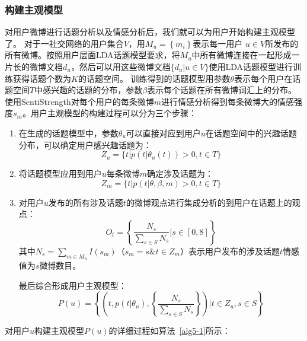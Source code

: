 \subsubsection{构建主观模型}
\label{concrete}
对用户微博进行话题分析以及情感分析后，我们就可以为用户开始构建主观模型了。
对于一社交网络的用户集合$ V $，用$ M_{u}=\left\lbrace m_{i} \right\rbrace$表示每一用户 $ u \in V $所发布的所有微博。按照用户层面LDA话题模型要求，将$ M_{u} $中所有微博连接在一起形成一片长的微博文档$ d_{u} $，然后可以用这些微博文档$\{ d_{u}|u \in V\} $使用LDA话题模型进行训练获得话题个数为$ K $的话题空间。
训练得到的话题模型用参数$ \theta $表示每个用户在话题空间$ T $中感兴趣的话题的分布，参数$ \beta $表示每个话题在所有微博词汇上的分布。
使用SentiStrength对每个用户的每条微博$ m $进行情感分析得到每条微博大的情感强度$ s_{m} $。用户主观模型的构建过程可以分为三个步骤：
\begin{enumerate}
\item 在生成的话题模型中，参数$ \theta_u $可以直接对应到用户$ u $在话题空间中的兴趣话题分布，可以确定用户感兴趣话题为：
\begin{equation}
\label{eq5-1}
Z_u=\{t|p(t|\theta_u(t))>0,t \in T\}
\end{equation}
\item 将话题模型应用到用户$ u $每条微博$ m $确定涉及话题为：
\begin{equation}
\label{eq5-2}
Z_m=\{t|p(t|\theta,\beta,m)>0,t \in T\}
\end{equation}
\item 对用户$ u $发布的所有涉及话题$ t $的微博观点进行集成分析的到用户在话题上的观点：
\begin{equation}
\label{eq5-3}
O_{t} = \left\{ \frac{N_{s}}{\sum_{s \in S} N_{s}} |s \in [0,8] \right\}
\end{equation}
其中$ N_s =\sum_{m \in M_{u}} I\left( s_{m} \right) $（$s_{m}=s \& t \in Z_{m} $）表示用户发布的涉及话题$ t $情感值为$ s $微博数目。

最后综合形成用户主观模型：
\begin{equation}
\label{subuser}
P(u)= \left\lbrace \left( t, p\left( t \vert \theta_{u} \right), \left\{ \frac{N_{s}}{\sum_{s \in S} N_{s}} \right\}  \right)  \vert t \in Z_{u}, s \in S  \right\rbrace
\end{equation}
\end{enumerate}

对用户$ u $构建主观模型$ P(u) $的详细过程如算法~\ref{alg5-1}所示：

